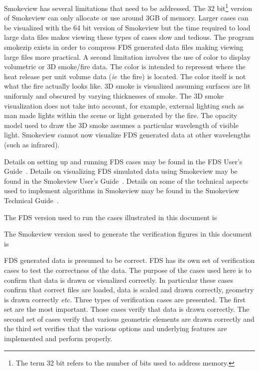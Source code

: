 \documentclass[11pt,twoside]{book}
\begin{document}
Smokeview has several limitations that need to be addressed.  The
32 bit\footnote{The term 32 bit refers to the number of bits used to address memory.}
version of Smokeview can only allocate or use around 3GB of memory.  Larger cases can be visualized
with the 64 bit version of Smokeview but the time required to load large data files makes viewing these types of cases slow and tedious.  The program smokezip exists in order to compress FDS generated data files making viewing large files more practical.  A second limitation involves the use of color to display volumetric or 3D smoke/fire data.  The color is intended to represent where the heat release per unit volume data ({\em ie}\ the fire) is located.  The color itself is not what the fire actually looks like.  3D smoke is visualized assuming surfaces are lit uniformly and obscured by varying thicknesses of smoke.  The 3D smoke visualization does not take into account, for example, external lighting such as man made lights within the scene or light generated by the fire.  The opacity model used to draw the 3D smoke assumes a particular wavelength of visible light. Smokeview cannot now visualize FDS generated data at other wavelengths (such as infrared).

Details on setting up and
running FDS cases may be found in the FDS User's
Guide~\cite{FDS_Users_Guide}.  Details on visualizing FDS simulated data using Smokeview may
be found in the Smokeview User's Guide~\cite{Smokeview_Users_Guide}.  Details on some of the technical
aspects used to implement algorithms in Smokeview may be found in the Smokeview Technical Guide~\cite{Smokeview_Tech_Guide}.

The FDS version used to run the cases illustrated  in this document
is
{

}

The Smokeview version used to generate the verification figures in this document is
{

}

FDS generated data is presumed
to be correct.  FDS has its own set of verification cases to test the correctness of the data.
The purpose of the cases used here is to confirm that data is drawn or visualized correctly.
In particular these cases confirm
that correct files are loaded, data is scaled and drawn correctly, geometry is drawn correctly
{\em etc.}   Three types of verification cases are presented. The first set are the most important. Those cases verify that data is drawn correctly.  The second set of
cases verify that various geometric elements are drawn correctly and the third set verifies
that the various options and underlying features are implemented and perform properly.
\end{document}

